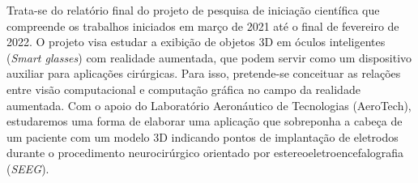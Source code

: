 \documentclass[Portugues]{projetoFAPESP}
\begin{document}
%
%
\geraTitulo
%
\folhaDeRosto
%
%

\begin{resumo}

Trata-se do relatório final do projeto de pesquisa de iniciação científica que compreende os trabalhos iniciados em março de 2021 até o final de fevereiro de 2022. O projeto visa estudar a exibição de objetos 3D em óculos inteligentes (\textit{Smart glasses}) com realidade aumentada, que podem servir como um dispositivo auxiliar para aplicações cirúrgicas. Para isso, pretende-se conceituar as relações entre visão computacional e computação gráfica no campo da realidade aumentada. Com o apoio do Laboratório Aeronáutico de Tecnologias (AeroTech), estudaremos uma forma de elaborar uma aplicação que sobreponha a cabeça de um paciente com um modelo 3D indicando pontos de implantação de eletrodos durante o procedimento neurocirúrgico orientado por estereoeletroencefalografia (\textit{SEEG}). 

  
\end{resumo}

 \clearpage
\tableofcontents
\thispagestyle{empty}
\clearpage
%
%
%

%

%

%

%
%

\printbibliography[heading=bibintoc, title={Referências bibliográficas} ]
\end{document}
